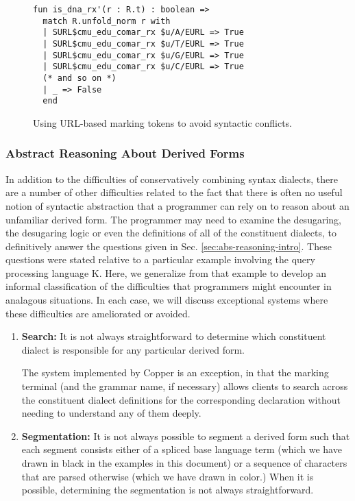 {
\begin{figure}
\begin{lstlisting}[numbers=none]
fun is_dna_rx'(r : R.t) : boolean => 
  match R.unfold_norm r with 
  | SURL$cmu_edu_comar_rx $u/A/EURL => True 
  | SURL$cmu_edu_comar_rx $u/T/EURL => True
  | SURL$cmu_edu_comar_rx $u/G/EURL => True
  | SURL$cmu_edu_comar_rx $u/C/EURL => True
  (* and so on *)
  | _ => False
  end
\end{lstlisting}
\caption{Using URL-based marking tokens to avoid syntactic conflicts.}
\label{fig:vanwyk}
\end{figure}

\subsubsection{Abstract Reasoning About Derived Forms}
In addition to the difficulties of conservatively combining syntax dialects, there are a  number of other difficulties related to the fact that there is often no useful notion of syntactic abstraction that a programmer can rely on to reason about an unfamiliar derived form. The programmer may need to examine the desugaring, the desugaring logic or even the definitions of all of the constituent dialects, to definitively answer the questions given in Sec. \ref{sec:abs-reasoning-intro}. These questions were stated relative to a particular example involving the query processing language K.  
Here, we generalize from that example to develop an informal classification of the difficulties that programmers might encounter in analagous situations. In each case, we will discuss exceptional systems where these difficulties are ameliorated or avoided.%

\begin{enumerate}
\item \textbf{Search:} It is not always straightforward to determine which constituent dialect is responsible for any particular derived form.

The system implemented by Copper \cite{conf/pldi/SchwerdfegerW09} is an exception, in that the marking terminal (and the grammar name, if necessary) allows clients to search across the constituent dialect definitions for the corresponding declaration without needing to understand any of them deeply.
\item \textbf{Segmentation:} It is not always possible to segment a derived form such that each segment consists either of a spliced base language term (which we have drawn in black in the examples in this document) or a sequence of characters that are parsed otherwise (which we have drawn in color.) When it is possible, determining the segmentation is not always straightforward.


\end{enumerate}}
